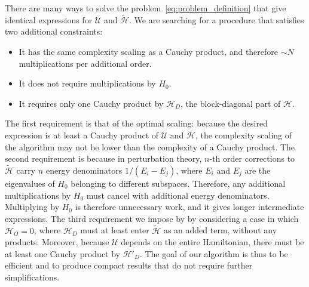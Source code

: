 There are many ways to solve the problem~\eqref{eq:problem_definition} that give identical expressions for $\mathcal{U}$ and $\tilde{\mathcal{H}}$.
We are searching for a procedure that satisfies two additional constraints:
%
\begin{itemize}
    \item It has the same complexity scaling as a Cauchy product, and therefore
    $\sim N$ multiplications per additional order.
    \item It does not require multiplications by $H_0$.
    \item It requires only one Cauchy product by $\mathcal{H}_D$, the block-diagonal
    part of $\mathcal{H}$.
\end{itemize}
%
The first requirement is that of the optimal scaling: because the desired expression is at least a Cauchy product of $\mathcal{U}$ and $\mathcal{H}$, the complexity scaling of the algorithm may not be lower than the complexity of a Cauchy product.
The second requirement is because in perturbation theory, $n$-th order corrections to $\tilde{\mathcal{H}}$ carry $n$ energy denominators $1/(E_i - E_j)$, where $E_i$ and $E_j$ are the eigenvalues of $H_0$ belonging to different subspaces.
Therefore, any additional multiplications by $H_0$ must cancel with additional energy denominators.
Multiplying by $H_0$ is therefore unnecessary work, and it gives longer intermediate expressions.
The third requirement we impose by by considering a case in which $\mathcal{H}_{O}=0$, where $\mathcal{H}_D$ must at least enter $\tilde{\mathcal{H}}$ as an added term, without any products.
Moreover, because $\mathcal{U}$ depends on the entire Hamiltonian, there must be at least one Cauchy product by $\mathcal{H}'_D$.
The goal of our algorithm is thus to be efficient and to produce compact results that do not require further simplifications.

